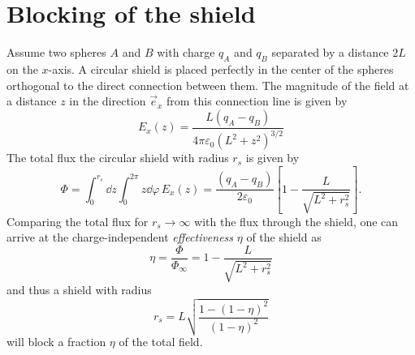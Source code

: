 \section{Blocking of the shield}\label{apx:blocking-of-the-shield}
Assume two spheres $A$ and $B$ with charge $q_A$ and $q_B$ separated by a distance $2L$ on the $x$-axis. A circular shield is placed perfectly in the center of the spheres orthogonal to the direct connection between them. The magnitude of the field at a distance $z$ in the direction $\vec{e}_x$ from this connection line is given by 
\begin{equation}
  E_x(z) = \frac{L(q_A - q_B)}{4\pi\varepsilon_0 (L^2 + z^2)^{3/2}}
\end{equation}
The total flux the circular shield with radius $r_s$ is given by
\begin{equation}
  \Phi = \int_{0}^{r_s}\dd z \int_{0}^{2\pi} z \dd \varphi \, E_x(z) = \frac{(q_A - q_B)}{2 \varepsilon_0} \left[ 1 - \frac{L}{\sqrt{L^2 + r_s^2}} \right] .
\end{equation}
Comparing the total flux for $r_s \rightarrow \infty$ with the flux through the shield, one can arrive at the charge-independent \emph{effectiveness} $\eta$ of the shield as
\begin{equation}
  \eta = \frac{\Phi}{\Phi_\infty} = 1 - \frac{L}{\sqrt{L^2 + r_s^2}}
\end{equation}
and thus a shield with radius
\begin{equation}
  r_s = L \sqrt{\frac{1 - (1-\eta)^2}{(1-\eta)^2}}
\end{equation}
will block a fraction $\eta$ of the total field.




